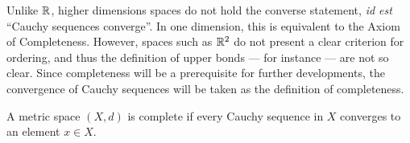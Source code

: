 Unlike $\mathbb{R}$, higher dimensions spaces do not hold the converse statement, \textit{id est} ``Cauchy sequences converge''. In one dimension, this is equivalent to the Axiom of Completeness. However, spaces such as $\mathbb{R}^2$ do not present a clear criterion for ordering, and thus the definition of upper bonds — for instance — are not so clear. Since completeness will be a prerequisite for further developments, the convergence of Cauchy sequences will be taken as the definition of completeness.

\begin{definition}[Completeness]
    A metric space $(X, d)$ is complete if every Cauchy sequence in $X$ converges to an element $x \in X$.
\end{definition}

